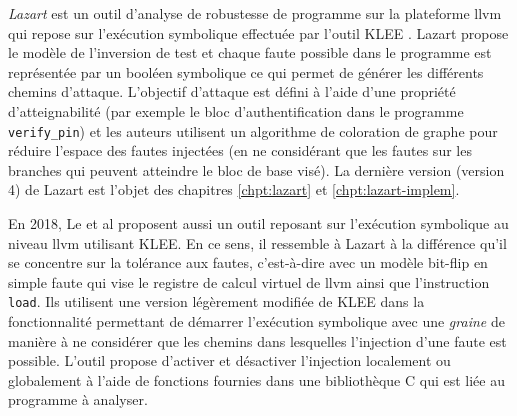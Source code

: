             \textit{Lazart} \cite{Potet/ICST14} est un outil d'analyse de robustesse de programme sur la plateforme \gls{llvm} qui repose sur l'exécution symbolique effectuée par l'outil KLEE \cite{Cadar/OSDI08}. Lazart propose le modèle de l'inversion de test et chaque faute possible dans le programme est représentée par un booléen symbolique ce qui permet de générer les différents chemins d'attaque. 
            L'objectif d'attaque est défini à l'aide d'une propriété d'atteignabilité (par exemple le bloc d'authentification dans le programme \texttt{verify\_pin}) et les auteurs utilisent un algorithme de coloration de graphe pour réduire l'espace des fautes injectées (en ne considérant que les fautes sur les branches qui peuvent atteindre le bloc de base visé). 
            La dernière version (version 4) de Lazart est l'objet des chapitres \ref{chpt:lazart} et \ref{chpt:lazart-implem}. 
            
            En 2018, Le et al \cite{Le/DATE18} proposent aussi un outil reposant sur l'exécution symbolique au niveau \gls{llvm} utilisant KLEE.
            En ce sens, il ressemble à Lazart à la différence qu'il se concentre sur la tolérance aux fautes, c'est-à-dire avec un modèle bit-flip en simple faute qui vise le registre de calcul virtuel de \gls{llvm} ainsi que l'instruction \texttt{load}.
            Ils utilisent une version légèrement modifiée de KLEE dans la fonctionnalité permettant de démarrer l'exécution symbolique avec une \textit{graine} de manière à ne considérer que les chemins dans lesquelles l'injection d'une faute est possible.
            L'outil propose d'activer et désactiver l'injection localement ou globalement à l'aide de fonctions fournies dans une bibliothèque C qui est liée au programme à analyser.
            
